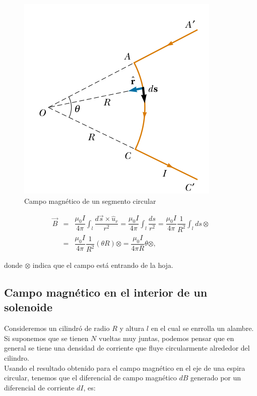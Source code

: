\begin{figure}[h]
\begin{center}
\includegraphics[scale=0.4]{magnetostatica/segmentocircular}
\end{center}
\caption{Campo magnético de un segmento circular}
\label{fig-segmentocircular}
\end{figure}

\begin{eqnarray}
\nonumber
\vec{B}&=&\dfrac{\mu_0 I}{4\pi}\int_l \dfrac{d\vec{s}\times \hat{u}_r}{r^{2}}
=\dfrac{\mu_0 I}{4\pi}\int_l \dfrac{ds}{r^{2}}
=\dfrac{\mu_0 I}{4\pi}\dfrac{1}{R^{2}} \int_l ds \otimes \\
&=&\dfrac{\mu_0 I}{4\pi}\dfrac{1}{R^{2}} (\theta R) \otimes
=\dfrac{\mu_0 I}{4\pi R}\theta \otimes ,
\end{eqnarray}

donde $\otimes$ indica que el campo está entrando de la hoja.

\subsection*{Campo magnético en el interior de un solenoide}

Consideremos un cilindró de radio $R$ y altura $l$ en el cual se enrrolla un alambre. Si suponemos que se tienen $N$ vueltas muy juntas, podemos pensar que en general se tiene una densidad de corriente que fluye circularmente alrededor del cilindro.\\
Usando el resultado obtenido para el campo magnético en el eje de una espira circular, tenemos que el diferencial de campo magnético $dB$ generado por un diferencial de corriente $dI$, es:

